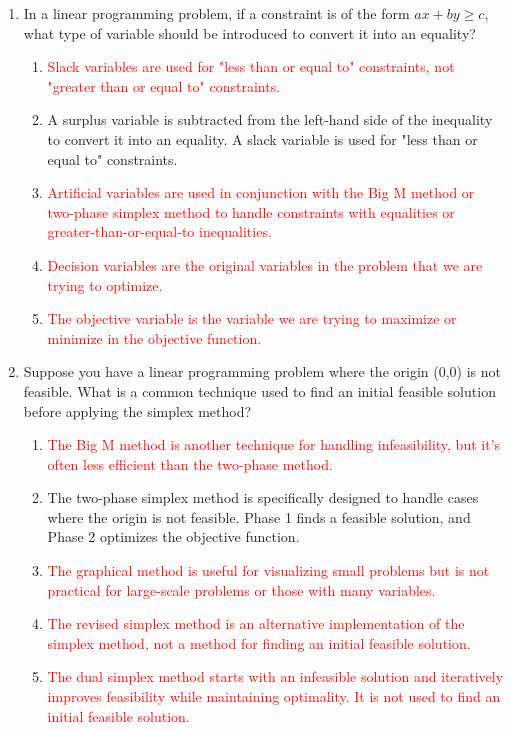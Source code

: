 \documentclass{article}%
\newcommand{\incorrect}[1]{\textcolor{red}{#1}}
\begin{document}
\begin{enumerate}
\vspace{1em}%
\item In a linear programming problem, if a constraint is of the form $ax + by \ge c$, what type of variable should be introduced to convert it into an equality?%
\begin{enumerate}%
\item \incorrect{Slack variables are used for "less than or equal to" constraints, not "greater than or equal to" constraints.}%
\item A surplus variable is subtracted from the left-hand side of the inequality to convert it into an equality.  A slack variable is used for "less than or equal to" constraints.%
\item \incorrect{Artificial variables are used in conjunction with the Big M method or two-phase simplex method to handle constraints with equalities or greater-than-or-equal-to inequalities.}%
\item \incorrect{Decision variables are the original variables in the problem that we are trying to optimize.}%
\item \incorrect{The objective variable is the variable we are trying to maximize or minimize in the objective function.}%
\end{enumerate}%
\vspace{1em}%
\item Suppose you have a linear programming problem where the origin (0,0) is not feasible.  What is a common technique used to find an initial feasible solution before applying the simplex method?%
\begin{enumerate}%
\item \incorrect{The Big M method is another technique for handling infeasibility, but it's often less efficient than the two-phase method.}%
\item The two-phase simplex method is specifically designed to handle cases where the origin is not feasible. Phase 1 finds a feasible solution, and Phase 2 optimizes the objective function.%
\item \incorrect{The graphical method is useful for visualizing small problems but is not practical for large-scale problems or those with many variables.}%
\item \incorrect{The revised simplex method is an alternative implementation of the simplex method, not a method for finding an initial feasible solution.}%
\item \incorrect{The dual simplex method starts with an infeasible solution and iteratively improves feasibility while maintaining optimality. It is not used to find an initial feasible solution.}%

\end{enumerate}
\end{enumerate}
\end{document}
